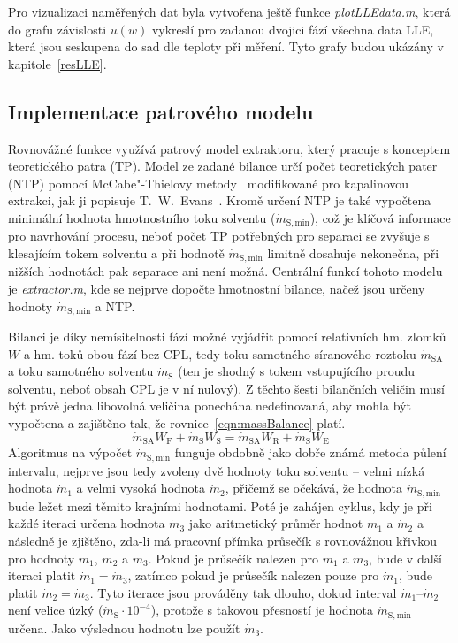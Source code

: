 Pro vizualizaci naměřených dat byla vytvořena ještě funkce \textit{plotLLEdata.m}, která do grafu závislosti $u(w)$ vykreslí pro zadanou dvojici fází všechna data LLE, která jsou seskupena do sad dle teploty při měření.
Tyto grafy budou ukázány v kapitole~\ref{resLLE}.

\subsection{Implementace patrového modelu} \label{compStage}
Rovnovážné funkce využívá patrový model extraktoru, který pracuje s konceptem teoretického patra (TP).
Model ze zadané bilance určí počet teoretických pater (NTP) pomocí McCabe"-Thielovy metody~\cite{McCabe1925} modifikované pro kapalinovou extrakci, jak ji popisuje T.~W.~Evans~\cite{Evans1934}.
Kromě určení NTP je také vypočtena minimální hodnota hmotnostního toku solventu ($\dot{m}_\mathrm{S,min}$), což je klíčová informace pro navrhování procesu, neboť počet TP potřebných pro separaci se zvyšuje s klesajícím tokem solventu a při hodnotě $\dot{m}_\mathrm{S,min}$ limitně dosahuje nekonečna, při nižších hodnotách pak separace ani není možná.
Centrální funkcí tohoto modelu je \textit{extractor.m}, kde se nejprve dopočte hmotnostní bilance, načež jsou určeny hodnoty $\dot{m}_\mathrm{S,min}$ a NTP.

Bilanci je díky nemísitelnosti fází možné vyjádřit pomocí relativních hm. zlomků $W$ a hm. toků obou fází bez CPL, tedy toku samotného síranového roztoku $\dot{m}_\mathrm{SA}$ a toku samotného solventu $\dot{m}_\mathrm{S}$ (ten je shodný s tokem vstupujícího proudu solventu, neboť obsah CPL je v ní nulový).
Z těchto šesti bilančních veličin musí být právě jedna libovolná veličina ponechána nedefinovaná, aby mohla být vypočtena a zajištěno tak, že rovnice~\ref{eqn:massBalance} platí.
\begin{equation}
\label{eqn:massBalance}
	\dot{m}_\mathrm{SA} W_\mathrm{F} + \dot{m}_\mathrm{S} W_\mathrm{S} = \dot{m}_\mathrm{SA} W_\mathrm{R} + \dot{m}_\mathrm{S} W_\mathrm{E}
\end{equation}
Algoritmus na výpočet $\dot{m}_\mathrm{S,min}$ funguje obdobně jako dobře známá metoda půlení intervalu, nejprve jsou tedy zvoleny dvě hodnoty toku solventu -- velmi nízká hodnota $\dot{m}_1$ a velmi vysoká hodnota $\dot{m}_2$, přičemž se očekává, že hodnota $\dot{m}_\mathrm{S,min}$ bude ležet mezi těmito krajními hodnotami.
Poté je zahájen cyklus, kdy je při každé iteraci určena hodnota $\dot{m}_3$ jako aritmetický průměr hodnot $\dot{m}_1$ a $\dot{m}_2$ a následně je zjištěno, zda-li má pracovní přímka průsečík s rovnovážnou křivkou pro hodnoty $\dot{m}_1$, $\dot{m}_2$ a $\dot{m}_3$.
Pokud je průsečík nalezen pro $\dot{m}_1$ a $\dot{m}_3$, bude v další iteraci platit $\dot{m}_1 = \dot{m}_3$, zatímco pokud je průsečík nalezen pouze pro $\dot{m}_1$, bude platit $\dot{m}_2 = \dot{m}_3$.
Tyto iterace jsou prováděny tak dlouho, dokud interval $\dot{m}_1$--$\dot{m}_2$ není velice úzký ($\dot{m}_\mathrm{S} \cdot 10^{-4}$), protože s takovou přesností je hodnota $\dot{m}_\mathrm{S,min}$ určena.
Jako výslednou hodnotu lze použít $\dot{m}_3$.


